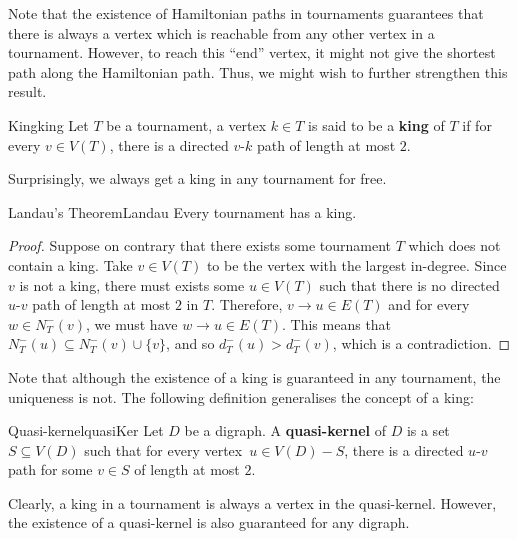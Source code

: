 \documentclass[math]{amznotes}
\theoremstyle{remark}
\begin{document}
Note that the existence of Hamiltonian paths in tournaments guarantees that there is always a vertex which is reachable from any other vertex in a tournament. However, to reach this ``end'' vertex, it might not give the shortest path along the Hamiltonian path. Thus, we might wish to further strengthen this result.
\begin{dfnbox}{King}{king}
    Let $T$ be a tournament, a vertex $k \in T$ is said to be a {\color{red} \textbf{king}} of $T$ if for every $v \in V(T)$, there is a directed $v$-$k$ path of length at most $2$.
\end{dfnbox}
Surprisingly, we always get a king in any tournament for free.
\begin{thmbox}{Landau's Theorem}{Landau}
    Every tournament has a king.
    \tcblower
    \begin{proof}
        Suppose on contrary that there exists some tournament $T$ which does not contain a king. Take $v \in V(T)$ to be the vertex with the largest in-degree. Since $v$ is not a king, there must exists some $u \in V(T)$ such that there is no directed $u$-$v$ path of length at most $2$ in $T$. Therefore, $v \to u \in E(T)$ and for every $w \in N_T^-(v)$, we must have $w \to u \in E(T)$. This means that $N_T^-(u) \subseteq N_T^-(v) \cup \{v \}$, and so $d_T^-(u) > d_T^-(v)$, which is a contradiction.
    \end{proof}
\end{thmbox}
Note that although the existence of a king is guaranteed in any tournament, the uniqueness is not. The following definition generalises the concept of a king:
\begin{dfnbox}{Quasi-kernel}{quasiKer}
    Let $D$ be a digraph. A {\color{red} \textbf{quasi-kernel}} of $D$ is a set $S \subseteq V(D)$ such that for every vertex~$u \in V(D) - S$, there is a directed $u$-$v$ path for some $v \in S$ of length at most $2$.
\end{dfnbox}
Clearly, a king in a tournament is always a vertex in the quasi-kernel. However, the existence of a quasi-kernel is also guaranteed for any digraph.
\end{document}

